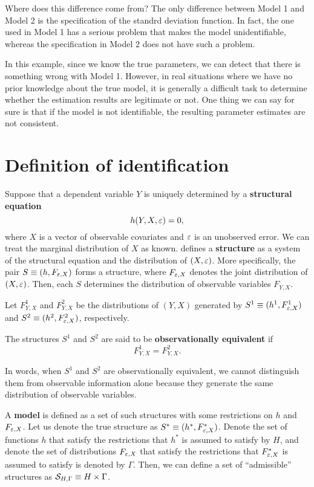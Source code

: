 \documentclass[11pt, A4paper, openany, uplatex]{book}
\begin{document}
Where does this difference come from?
The only difference between Model 1 and Model 2 is the specification of the standrd deviation function.
In fact, the one used in Model 1 has a serious problem that makes the model unidentifiable, whereas the specification in Model 2 does not have such a problem.

In this example, since we know the true parameters, we can detect that there is something wrong with Model 1.
However, in real situations where we have no prior knowledge about the true model, it is generally a difficult task to determine whether the estimation results are legitimate or not.
One thing we can say for sure is that if the model is not identifiable, the resulting parameter estimates are not consistent.

\section{Definition of identification}

Suppose that a dependent variable $Y$ is uniquely determined by a \textbf{structural equation}
\[
	h(Y, X, \varepsilon) = 0,
\]
where $X$ is a vector of observable covariates and $\varepsilon$ is an unobserved error.
We can treat the marginal distribution of $X$ as known.
\cite{hurwicz1950generalization} defines a \textbf{structure} as a system of the structural equation and the distribution of $(X, \varepsilon)$.
More specifically, the pair $S \equiv (h, F_{\varepsilon,X})$ forms a structure, where $F_{\varepsilon,X}$ denotes the joint distribution of $(X, \varepsilon)$.
Then, each $S$ determines the distribution of observable variables $F_{Y,X}$.

Let $F^1_{Y,X}$ and $F^2_{Y,X}$ be the distributions of $(Y, X)$ generated by $S^1 \equiv (h^1, F^1_{\varepsilon,X})$ and $S^2 \equiv (h^2, F^2_{\varepsilon,X})$, respectively.

\begin{definition}
	The structures $S^1$ and $S^2$ are said to be \textbf{observationally equivalent} if
	\[
	F^1_{Y,X} = F^2_{Y,X}.
	\]
\end{definition}
In words, when $S^1$ and $S^2$ are observationally equivalent, we cannot distinguish them from observable information alone because they generate the same distribution of observable variables.

A \textbf{model} is defined as a set of such structures with some restrictions on $h$ and $F_{\varepsilon,X}$.
Let us denote the true structure as $S^* \equiv (h^*, F^*_{\varepsilon,X})$.
Denote the set of functions $h$ that satisfy the restrictions that $h^*$ is assumed to satisfy by $H$, and denote the set of distributions $F_{\varepsilon,X}$ that satisfy the restrictions that $F^*_{\varepsilon,X}$ is assumed to satisfy is denoted by $\Gamma$.
Then, we can define a set of ``admissible'' structures as $\mathcal{S}_{H,\Gamma} \equiv H \times \Gamma$.
\end{document}
